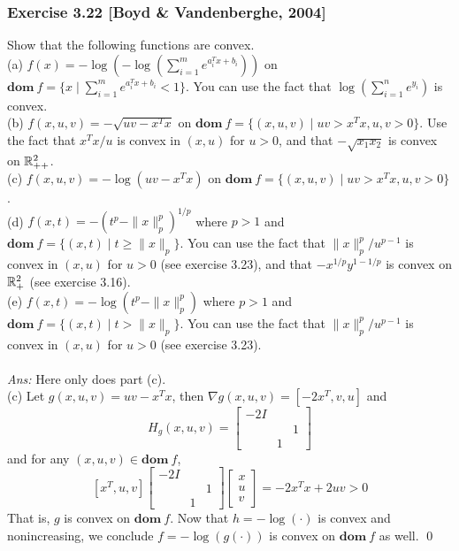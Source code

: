 \documentclass[12pt,a4paper]{article}
\renewcommand{\l}{\left}\renewcommand{\r}{\right}
\newcommand\dom{\mathbf{dom\:}}
\def\R{\ifmmode\mathbb R\fi}
\begin{document}
\newpage\subsubsection*{Exercise 3.22 [Boyd \& Vandenberghe, 2004]}
 Show that the following functions are convex. \\
(a) $f(x) = -\log(-\log(\sum^m_{i=1} e^{a_i^T x + b_i}))$ on $\dom f = \{x \mid \sum^m_{i=1} e^{a_i^T x + b_i} < 1\}$. You can use the fact that $\log(\sum^n_{i=1} e^{y_i})$ is convex.\\
(b) $f(x, u, v) = -\sqrt{uv-x^Tx}$ on $\dom f = \{(x,u,v) \mid uv>x^T x, u, v>0\}$. Use the fact that $x^T x/u$ is convex in $(x, u)$ for $u>0$, and that $-\sqrt{x_1x_2}$ is convex on $\R^2_{++}$. \\
(c) $f(x,u,v) = -\log(uv-x^Tx)$ on $\dom f = \{(x,u,v) \mid uv>x^Tx, u,v>0\}$.\\
(d) $f(x,t) = -(t^p - \|x\|_p^p)^{1/p}$ where $p>1$ and $\dom f = \{(x, t) \mid t\geq \|x\|_p\}$. You can use the fact that $\|x\|^p_p/u^{p-1}$ is convex in $(x,u)$ for $u>0$ (see exercise 3.23), and that $-x^{1/p}y^{1-1/p}$ is convex on $\R^2_+$ (see exercise 3.16). \\
(e) $f(x,t) = -\log(t^p - \|x\|_p^p)$ where $p>1$ and $\dom f = \{(x,t) \mid t>\|x\|_p\}$. You can use the fact that $\|x\|^p_p/u^{p-1}$ is convex in $(x,u)$ for $u>0$ (see exercise 3.23).\\
\\
{\it Ans:} Here only does part (c).  \\
(c) Let $g(x,u,v) = uv-x^Tx$, then $\nabla g(x,u,v) = [-2x^T, v,u]$ and 
$$H_g(x,u,v) = \l[\begin{array}{ccc}
-2I & & \\
& & 1 \\
& 1 & \end{array}\r]$$
and for any $(x,u,v)\in\dom f$, 
$$[x^T,u,v]\l[\begin{array}{ccc}
-2I & & \\
& & 1 \\
& 1 & \end{array}\r]\l[\begin{array}{c}
x\\
u\\
v\end{array}\r] = -2x^Tx + 2uv >0$$
That is, $g$ is convex on $\dom f$. Now that $h = -\log(\cdot)$ is convex and nonincreasing, we conclude $f = -\log(g(\cdot))$ is convex on $\dom f$ as well. \qed
\end{document}
